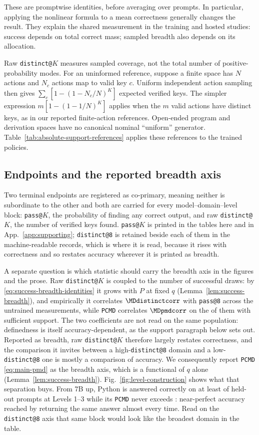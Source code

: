 \documentclass{article}
\makeatletter
\newcommand{\1}{\mathbf 1}
\newcommand{\pmd}{\texttt{PCMD}}
\newcommand{\distk}{\texttt{distinct@8}}
\theoremstyle{remark}
\theoremstyle{definition}
\theoremstyle{plain}
\makeatother
\begin{document}
These are promptwise identities, before averaging over prompts. In particular,
applying the nonlinear formula to a mean correctness generally changes the
result. They explain the shared measurement in the training and hosted
studies: success depends on total correct mass; sampled breadth also depends
on its allocation.

Raw \texttt{distinct@}$K$ measures sampled coverage, not the total number of
positive-probability modes. For an uninformed reference, suppose a finite
space has $N$ actions and $N_c$ actions map to valid key $c$. Uniform
independent action sampling then gives $\sum_c[1-(1-N_c/N)^K]$ expected
verified keys. The simpler expression $m[1-(1-1/N)^K]$ applies when the $m$
valid actions have distinct keys, as in our reported finite-action references.
Open-ended program and derivation spaces have no canonical nominal
``uniform'' generator. Table~\ref{tab:absolute-support-references} applies these
references to the trained policies.

\subsection{Endpoints and the reported breadth axis}
\label{app:registered-endpoints}

Two terminal endpoints are registered as co-primary, meaning neither is
subordinate to the other and both are carried for every
model--domain--level block: \texttt{pass@}$K$, the probability of finding any
correct output, and raw \texttt{distinct@}$K$, the number of verified keys
found. \texttt{pass@}$K$ is printed in the tables here and in
App.~\ref{app:supporting}; \distk{} is retained beside each of them in the
machine-readable records, which is where it is read, because it rises with
correctness and so restates accuracy wherever it is printed as breadth.

A separate question is which statistic should carry the breadth axis in the
figures and the prose. Raw \texttt{distinct@}$K$ is coupled to the number of
successful draws: by \eqref{eq:success-breadth-identities} it grows with $P$
at fixed $q$ (Lemma~\ref{lem:success-breadth}), and empirically it correlates
$\MDdistinctcorr$ with \texttt{pass@8} across the \MDcells{} untrained
measurements, while \pmd{} correlates $\MDpmdcorr$ on the \MDreportable{} of
them with sufficient support. The two coefficients are not read on the same
population: definedness is itself accuracy-dependent, as the support paragraph
below sets out. Reported as breadth, raw \texttt{distinct@}$K$ therefore
largely restates correctness, and the comparison it invites between a
high-\texttt{distinct@8} domain and a
low-\texttt{distinct@8} one is mostly a comparison of accuracy. We
consequently report \pmd{} \eqref{eq:main-pmd} as the breadth axis, which is a
functional of $q$ alone (Lemma~\ref{lem:success-breadth}).
Fig.~\ref{fig:level-construction} shows what that separation buys.
From 7B up, Python is answered correctly on at least \MDpyPasslo{} of held-out
prompts at Levels 1--3 while its \pmd{} never exceeds \MDpyPmdhi{}:
near-perfect accuracy reached by returning the same answer almost every time.
Read on the \texttt{distinct@8} axis that same block would look like the
broadest domain in the table.
\end{document}
